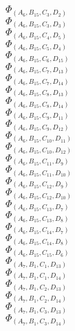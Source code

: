 \documentclass[14pt]{article}
\begin{document}
    $\Phi_{({A}_{6}, {B}_{15}, {C}_{3}, {D}_{2})}$ \\ 
    $\Phi_{({A}_{6}, {B}_{15}, {C}_{3}, {D}_{3})}$ \\ 
    $\Phi_{({A}_{6}, {B}_{15}, {C}_{4}, {D}_{5})}$ \\ 
    $\Phi_{({A}_{6}, {B}_{15}, {C}_{5}, {D}_{4})}$ \\ 
    $\Phi_{({A}_{6}, {B}_{15}, {C}_{6}, {D}_{15})}$ \\ 
    $\Phi_{({A}_{6}, {B}_{15}, {C}_{7}, {D}_{13})}$ \\ 
    $\Phi_{({A}_{6}, {B}_{15}, {C}_{7}, {D}_{14})}$ \\ 
    $\Phi_{({A}_{6}, {B}_{15}, {C}_{8}, {D}_{13})}$ \\ 
    $\Phi_{({A}_{6}, {B}_{15}, {C}_{8}, {D}_{14})}$ \\ 
    $\Phi_{({A}_{6}, {B}_{15}, {C}_{9}, {D}_{11})}$ \\ 
    $\Phi_{({A}_{6}, {B}_{15}, {C}_{9}, {D}_{12})}$ \\ 
    $\Phi_{({A}_{6}, {B}_{15}, {C}_{10}, {D}_{11})}$ \\ 
    $\Phi_{({A}_{6}, {B}_{15}, {C}_{10}, {D}_{12})}$ \\ 
    $\Phi_{({A}_{6}, {B}_{15}, {C}_{11}, {D}_{9})}$ \\ 
    $\Phi_{({A}_{6}, {B}_{15}, {C}_{11}, {D}_{10})}$ \\ 
    $\Phi_{({A}_{6}, {B}_{15}, {C}_{12}, {D}_{9})}$ \\ 
    $\Phi_{({A}_{6}, {B}_{15}, {C}_{12}, {D}_{10})}$ \\ 
    $\Phi_{({A}_{6}, {B}_{15}, {C}_{13}, {D}_{7})}$ \\ 
    $\Phi_{({A}_{6}, {B}_{15}, {C}_{13}, {D}_{8})}$ \\ 
    $\Phi_{({A}_{6}, {B}_{15}, {C}_{14}, {D}_{7})}$ \\ 
    $\Phi_{({A}_{6}, {B}_{15}, {C}_{14}, {D}_{8})}$ \\ 
    $\Phi_{({A}_{6}, {B}_{15}, {C}_{15}, {D}_{6})}$ \\ 
    $\Phi_{({A}_{7}, {B}_{1}, {C}_{1}, {D}_{13})}$ \\ 
    $\Phi_{({A}_{7}, {B}_{1}, {C}_{1}, {D}_{14})}$ \\ 
    $\Phi_{({A}_{7}, {B}_{1}, {C}_{2}, {D}_{13})}$ \\ 
    $\Phi_{({A}_{7}, {B}_{1}, {C}_{2}, {D}_{14})}$ \\ 
    $\Phi_{({A}_{7}, {B}_{1}, {C}_{3}, {D}_{13})}$ \\ 
    $\Phi_{({A}_{7}, {B}_{1}, {C}_{3}, {D}_{14})}$ \\ 
\end{document}

